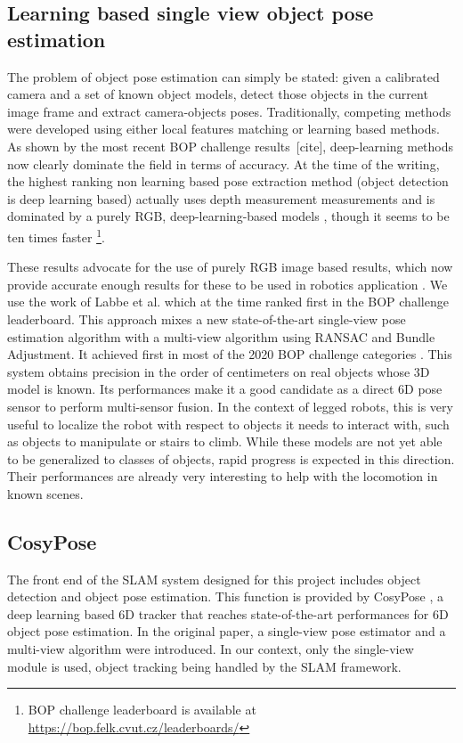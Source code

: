 \subsection{Learning based single view object pose estimation}
The problem of object pose estimation can simply be stated: given a calibrated camera and a set of known object models, detect those objects in the current image 
frame and extract camera-objects poses. Traditionally, competing methods were developed using either local features matching or learning based methods.
As shown by the most recent BOP challenge results [cite], deep-learning methods now clearly dominate the field in terms of accuracy. 
At the time of the writing, the highest ranking non learning based pose extraction method \cite{konig2020hybrid} (object detection is deep learning based) 
actually uses depth measurement measurements and is dominated by a purely RGB, deep-learning-based models \cite{haugaard2021surfemb}, though it seems to be ten 
times faster \footnote{BOP challenge leaderboard is available at \url{https://bop.felk.cvut.cz/leaderboards/}}.

These results advocate for the use of purely RGB image based results, which now provide accurate enough results for these to be used in robotics application 
\cite{labbe2021single}. We use the work of Labbe et al. \cite{labbe2020cosypose} which at the time ranked first in the BOP challenge leaderboard.
This approach mixes a new state-of-the-art single-view pose estimation algorithm with a multi-view algorithm using RANSAC and Bundle Adjustment. 
It achieved first in most of the 2020 BOP challenge categories \cite{hodavn2020bop}. This system obtains precision in the order of centimeters 
on real objects whose 3D model is known. Its performances make it a good candidate as a direct 6D pose sensor to perform multi-sensor fusion. 
In the context of legged robots, this is very useful to localize the robot with respect to objects it needs to interact with, such as objects 
to manipulate or stairs to climb. While these models are not yet able to be generalized to classes of objects, rapid progress is expected in 
this direction. Their performances are already very interesting to help with the locomotion in known scenes.

\subsection{CosyPose}
The front end of the SLAM system designed for this project includes object detection and object pose estimation. 
This function is provided by CosyPose \cite{labbe2020cosypose}, a deep learning based 6D tracker that reaches state-of-the-art
 performances for 6D object pose estimation. %
In the original paper, a single-view pose estimator and a multi-view algorithm were introduced. In our context, only the single-view module is used, 
object tracking being handled by the SLAM framework. 

